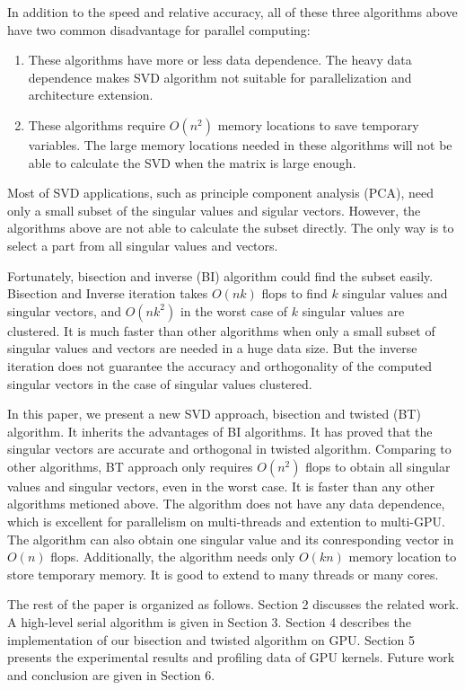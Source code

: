 In addition to the speed and relative accuracy, all of these three algorithms above have two common disadvantage for parallel computing:
\begin{enumerate}
\item These algorithms have more or less data dependence.
The heavy data dependence makes SVD algorithm not suitable for parallelization and architecture extension.
\item  These algorithms require $O(n^2)$ memory locations to save temporary variables.
The large memory locations needed in these algorithms will not be able to calculate the SVD when the matrix is large enough.
\end{enumerate}

Most of SVD applications, such as principle component analysis (PCA), need only a small subset of the singular values and sigular vectors.
However, the algorithms above are not able to calculate the subset directly.
The only way is to select a part from all singular values and vectors.

Fortunately, bisection and inverse (BI) algorithm could find the subset easily.
Bisection and Inverse iteration takes $O(nk)$ flops to find $k$ singular values and singular vectors, and $O(nk^2)$ in the worst case of $k$ singular values are clustered.
It is much faster than other algorithms when only a small subset of singular values and vectors are needed in a huge data size.
But the inverse iteration does not guarantee the accuracy and orthogonality of the computed singular vectors in the case of singular values clustered.

In this paper, we present a new SVD approach, bisection and twisted (BT) algorithm.
It inherits the advantages of BI algorithms.
It has proved that the singular vectors are accurate and orthogonal in twisted algorithm\cite{09NLAAtwisted}.
Comparing to other algorithms, BT approach only requires $O(n^2)$ flops to obtain all singular values and singular vectors\cite{09NLAAtwisted,05UCB}, even in the worst case.
It is faster than any other algorithms metioned above.
The algorithm does not have any data dependence, which is excellent for parallelism on multi-threads and extention to multi-GPU.
The algorithm can also obtain one singular value and its conresponding vector in $O(n)$ flops.
Additionally, the algorithm needs only $O(kn)$ memory location to store temporary memory.
It is good to extend to many threads or many cores.

The rest of the paper is organized as follows.
Section 2 discusses the related work.
A high-level serial algorithm is given in Section 3.
Section 4 describes the implementation of our bisection and twisted algorithm on GPU.
Section 5 presents the experimental results and profiling data of GPU kernels.
Future work and conclusion are given in Section 6.


